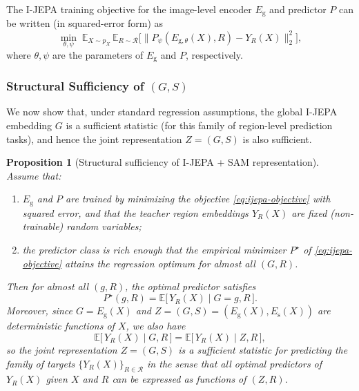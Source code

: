 \documentclass[12pt]{article}
\newtheorem{proposition}{Proposition}
\begin{document}
The I-JEPA training objective for the image-level encoder \(E_{\mathrm{g}}\)
and predictor \(P\) can be written (in squared-error form) as
\begin{equation}
\label{eq:ijepa-objective}
\min_{\theta,\psi} \;
\mathbb{E}_{X \sim p_X}\,\mathbb{E}_{R \sim \mathcal{R}}
\big[
\|P_\psi(E_{\mathrm{g},\theta}(X), R) - Y_R(X)\|_2^2
\big],
\end{equation}
where \(\theta,\psi\) are the parameters of \(E_{\mathrm{g}}\) and \(P\),
respectively.

\subsubsection{Structural Sufficiency of \texorpdfstring{$(G,S)$}{(G,S)}}

We now show that, under standard regression assumptions, the global
I-JEPA embedding \(G\) is a sufficient statistic (for this family of
region-level prediction tasks), and hence the joint representation
\(Z = (G,S)\) is also sufficient.

\begin{proposition}[Structural sufficiency of I-JEPA + SAM representation]
\label{prop:structural-sufficiency}
Assume that:
\begin{enumerate}
    \item[(i)] \(E_{\mathrm{g}}\) and \(P\) are trained by minimizing
    the objective \eqref{eq:ijepa-objective} with squared error,
    and that the teacher region embeddings \(Y_R(X)\) are fixed
    (non-trainable) random variables;
    \item[(ii)] the predictor class is rich enough that the empirical
    minimizer \(P^\star\) of \eqref{eq:ijepa-objective} attains the
    regression optimum for almost all \((G,R)\).
\end{enumerate}
Then for almost all \((g,R)\), the optimal predictor satisfies
\begin{equation}
\label{eq:cond-mean-g}
P^\star(g,R)
= \mathbb{E}\big[\,Y_R(X) \mid G = g, R\,\big].
\end{equation}
Moreover, since \(G = E_{\mathrm{g}}(X)\) and
\(Z = (G,S) = (E_{\mathrm{g}}(X), E_{\mathrm{s}}(X))\) are deterministic
functions of \(X\), we also have
\begin{equation}
\label{eq:cond-mean-z}
\mathbb{E}\big[\,Y_R(X) \mid G, R\,\big]
= \mathbb{E}\big[\,Y_R(X) \mid Z, R\,\big],
\end{equation}
so the joint representation \(Z = (G,S)\) is a sufficient statistic for
predicting the family of targets \(\{Y_R(X)\}_{R \in \mathcal{R}}\) in the
sense that all optimal predictors of \(Y_R(X)\) given \(X\) and \(R\) can
be expressed as functions of \((Z,R)\).
\end{proposition}
\end{document}
